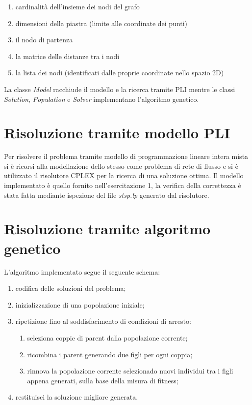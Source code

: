 \documentclass[a4paper]{article}
\begin{document}
        \begin{enumerate}
            \item cardinalit\`a dell'insieme dei nodi del grafo
            \item dimensioni della piastra (limite alle coordinate dei punti)
            \item il nodo di partenza
            \item la matrice delle distanze tra i nodi
            \item la lista dei nodi (identificati dalle proprie coordinate nello spazio 2D)
        \end{enumerate}

        La classe \emph{Model} racchiude il modello e la ricerca tramite PLI mentre le classi \emph{Solution}, \emph{Population} e \emph{Solver}
        implementano l'algoritmo genetico.
        
    \section{Risoluzione tramite modello PLI}
        Per risolvere il problema tramite modello di programmazione lineare intera mista si \`e ricorsi alla modellazione dello stesso come problema di
        rete di flusso e si \`e utilizzato il risolutore CPLEX per la ricerca di una soluzione ottima.
        Il modello implementato \`e quello fornito nell'esercitazione 1, la verifica della correttezza \`e stata fatta mediante ispezione del file
        \emph{stsp.lp} generato dal risolutore.

    \section{Risoluzione tramite algoritmo genetico}
        L'algoritmo implementato segue il seguente schema:
        \begin{enumerate}
            \item codifica delle soluzioni del problema;
            \item inizializzazione di una popolazione iniziale;
            \item ripetizione fino al soddisfacimento di condizioni di arresto:
                \begin{enumerate}
                    \item seleziona coppie di parent dalla popolazione corrente;
                    \item ricombina i parent generando due figli per ogni coppia;
                    \item rinnova la popolazione corrente selezionado nuovi individui
                        tra i figli appena generati, sulla base della misura di fitness;
                \end{enumerate}
            \item restituisci la soluzione migliore generata.
        \end{enumerate}
\end{document}
